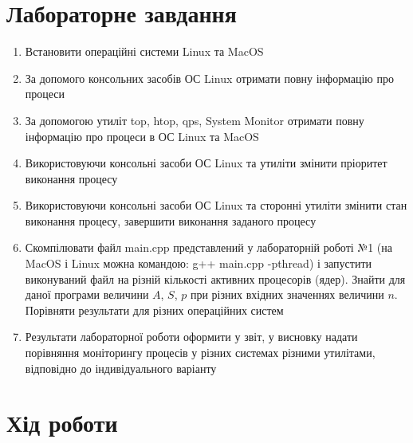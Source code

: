 \documentclass{article}
\begin{document}
\begin{normalsize}
	\section*{Лабораторне завдання}
	\begin{enumerate}
		\item Встановити операційні системи Linux та MacOS
		\item За допомого консольних засобів ОС Linux отримати повну інформацію
		про процеси
		\item За допомогою утиліт top, htop, qps, System Monitor отримати повну
		інформацію про процеси в ОС Linux та MacOS
		\item Використовуючи консольні засоби ОС Linux та утиліти змінити
		пріоритет виконання процесу
		\item Використовуючи консольні засоби ОС Linux та сторонні утиліти
		змінити стан виконання процесу, завершити виконання заданого процесу
		\item Скомпілювати файл main.cpp представлений у лабораторній роботі №1
		(на MacOS і Linux можна командою: g++ main.cpp -pthread) і запустити
		виконуваний файл на різній кількості активних процесорів (ядер). Знайти для
		даної програми величини $A$, $S$, $p$  при різних вхідних значеннях величини $n$.
		Порівняти результати для різних операційних систем
		\item Результати лабораторної роботи оформити у звіт, у висновку надати
		порівняння моніторингу процесів у різних системах різними утилітами,
		відповідно до індивідуального варіанту
	\end{enumerate}

	\section*{Хід роботи}	

\end{normalsize}
\end{document}
